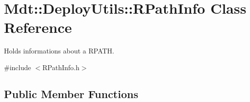 \hypertarget{class_mdt_1_1_deploy_utils_1_1_r_path_info}{}\section{Mdt\+:\+:Deploy\+Utils\+:\+:R\+Path\+Info Class Reference}
\label{class_mdt_1_1_deploy_utils_1_1_r_path_info}


Holds informations about a R\+P\+A\+TH.  




{\ttfamily \#include $<$R\+Path\+Info.\+h$>$}

\subsection*{Public Member Functions}
